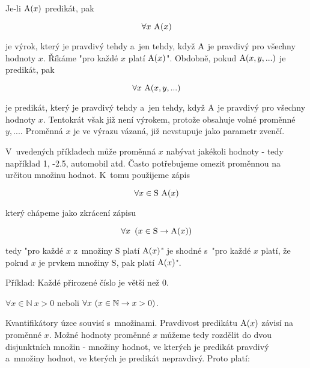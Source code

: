 Je-li \(\mathrm{A}(x)\) predikát, pak

\begin{equation}
\forall x \ \predicate{A}(x)
\end{equation}

je výrok, který je pravdivý tehdy a~jen tehdy, když \(\mathrm{A}\) je pravdivý pro všechny hodnoty \(x\). Říkáme "pro každé \(x\) platí \(\mathrm{A}(x)\)". Obdobně, pokud \(\mathrm{A}(x, y, ...)\) je predikát, pak

\begin{equation}
\forall x \ \mathrm{A}(x, y, ...)
\end{equation}

je predikát, který je pravdivý tehdy a~jen tehdy, když \(\mathrm{A}\) je pravdivý pro všechny hodnoty \(x\). Tentokrát však již není výrokem, protože obsahuje volné proměnné \(y, ...\). Proměnná \(x\) je ve výrazu vázaná, již nevstupuje jako parametr zvenčí.

V~uvedených příkladech může proměnná \(x\) nabývat jakékoli hodnoty - tedy například 1, -2.5, automobil atd. Často potřebujeme omezit proměnnou na určitou množinu hodnot. K~tomu použijeme zápis

\begin{equation}
\forall x \in \mathrm{S} \ \predicate{A}(x)
\end{equation}

který chápeme jako zkrácení zápisu

\begin{equation}
\forall x \ \left( x \in \mathrm{S} \rightarrow \mathrm{A}(x) \right)
\end{equation}

tedy "pro každé \(x\) z~množiny \(\mathrm{S}\) platí \(\mathrm{A}(x)\)" je shodné s~"pro každé \(x\) platí, že pokud \(x\) je prvkem množiny \(\mathrm{S}\), pak platí \(\mathrm{A}(x)\)".

Příklad: Každé přirozené číslo je větší než 0. 

\(\forall x \in \mathbb{N} \ x > 0\) neboli \(\forall x \ (x \in \mathbb{N} \rightarrow x > 0)\).

Kvantifikátory úzce souvisí s~množinami. Pravdivost predikátu \(\mathrm{A}(x)\) závisí na proměnné \(x\). Možné hodnoty
proměnné \(x\) můžeme tedy rozdělit do dvou disjunktních množin - množiny hodnot, ve kterých je predikát pravdivý a~množiny hodnot, ve kterých je predikát nepravdivý. Proto platí:


